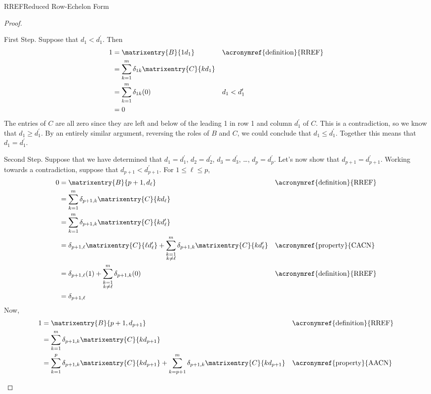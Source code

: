\begin{subsect}{RREF}{Reduced Row-Echelon Form}
\begin{proof}
%
\begin{para}
First Step.  Suppose that $d_1<d^\prime_1$.  Then
%
\begin{align*}
1
&=\matrixentry{B}{1d_1}
&&\text{\acronymref{definition}{RREF}}\\
%
&=\sum_{k=1}^{m}\delta_{1k}\matrixentry{C}{kd_1}\\
%
&=\sum_{k=1}^{m}\delta_{1k}(0)
&&d_1<d^\prime_1\\
%
&=0
\end{align*}
%
The entries of $C$ are all zero since they are left and below of the leading 1 in row 1 and column $d^\prime_1$ of $C$.  This is a contradiction, so we know that $d_1\geq d^\prime_1$.  By an entirely similar argument, reversing the roles of $B$ and $C$, we could conclude that $d_1\leq d^\prime_1$.  Together this means that $d_1=d^\prime_1$.\end{para}
%
\begin{para}
Second Step.  Suppose that we have determined that $d_1=d^\prime_1$, $d_2=d^\prime_2$, $d_3=d^\prime_3$, \dots, $d_p=d^\prime_p$.  Let's now show that $d_{p+1}=d^\prime_{p+1}$.  Working towards a contradiction, suppose that $d_{p+1}<d^\prime_{p+1}$.  For $1\leq\ell\leq p$,
%
\begin{align*}
0
&=\matrixentry{B}{p+1,d_\ell}
&&\text{\acronymref{definition}{RREF}}\\
%
&=\sum_{k=1}^{m}\delta_{p+1,k}\matrixentry{C}{kd_\ell}\\
%
&=\sum_{k=1}^{m}\delta_{p+1,k}\matrixentry{C}{kd^\prime_\ell}\\
%
&=
\delta_{p+1,\ell}\matrixentry{C}{\ell d^\prime_\ell}+
\sum_{\substack{k=1\\k\neq\ell}}^{m}\delta_{p+1,k}\matrixentry{C}{kd^\prime_\ell}
&&\text{\acronymref{property}{CACN}}\\
%
&=
\delta_{p+1,\ell}(1)+
\sum_{\substack{k=1\\k\neq\ell}}^{m}\delta_{p+1,k}(0)
&&\text{\acronymref{definition}{RREF}}\\
%
&=\delta_{p+1,\ell}
%
\end{align*}
%
Now,
%
\begin{align*}
1
&=\matrixentry{B}{p+1,d_{p+1}}
&&\text{\acronymref{definition}{RREF}}\\
%
&=\sum_{k=1}^{m}\delta_{p+1,k}\matrixentry{C}{kd_{p+1}}\\
%
&=
\sum_{k=1}^{p}\delta_{p+1,k}\matrixentry{C}{kd_{p+1}}+
\sum_{k=p+1}^{m}\delta_{p+1,k}\matrixentry{C}{kd_{p+1}}
&&\text{\acronymref{property}{AACN}}\\

\end{align*}
\end{para}
\end{proof}
\end{subsect}
